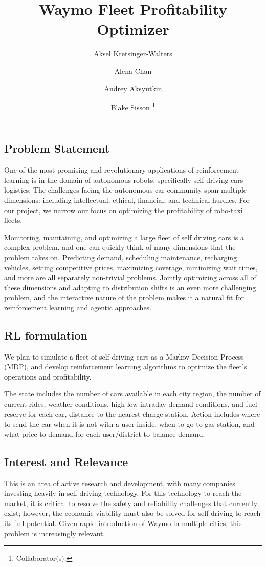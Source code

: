 \documentclass[12pt]{article}
\title{Waymo Fleet Profitability Optimizer}
\author{
		Aksel Kretsinger-Walters \and
		Alena Chan \and
		Andrey Aksyutkin \and
		Blake Sisson \footnote{Collaborator(s): \collaborators}
}
\date{}
\begin{document}
\maketitle

\subsection*{Problem Statement}
One of the most promising and revolutionary applications of reinforcement learning is in
the domain of autonomous robots, specifically self-driving cars logistics. The challenges facing the
autonomous car community span multiple dimensions: including intellectual, ethical, financial,
and technical hurdles. For our project, we narrow our focus on optimizing the profitability
of robo-taxi fleets.

Monitoring, maintaining, and optimizing a large fleet of self driving cars is a complex
problem, and one can quickly think of many dimensions that the problem takes on.
Predicting demand, scheduling maintenance, recharging vehicles, setting competitive
prices, maximizing coverage, minimizing wait times, and more are all separately non-trivial
problems. Jointly optimizing across all of these dimensions and adapting to distribution shifts
is an even more challenging problem, and the interactive nature of the problem makes it a natural
fit for reinforcement learning and agentic approaches.

\subsection*{RL formulation}

We plan to simulate a fleet of self-driving cars as a Markov Decision Process (MDP), and
develop reinforcement learning algorithms to optimize the fleet's operations and profitability.

The state includes the number of cars available in each city region, the number of
current rides, weather conditions, high-low intraday demand conditions, and fuel reserve
for each car, distance to the nearest charge station. Action includes where to send the
car when it is not with a user inside, when to go to gas station, and what price to
demand for each user/district to balance demand.

\subsection*{Interest and Relevance}
This is an area of active research and development, with many companies investing heavily in
self-driving technology. For this technology to reach the market, it is critical to resolve the
safety and reliability challenges that currently exist; however, the economic viability must
also be solved for self-driving to reach its full potential. Given rapid introduction of
Waymo in multiple cities, this problem is increasingly relevant.
\end{document}

